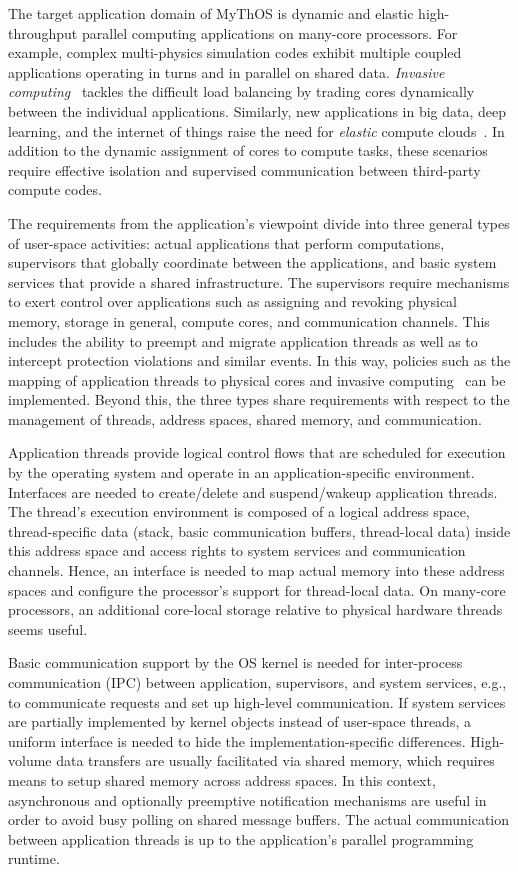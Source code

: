 The target application domain of MyThOS is dynamic and elastic high-throughput parallel 
computing applications on many-core processors. 
%
For example, complex multi-physics simulation codes exhibit multiple coupled applications operating in turns and in parallel on shared data. \emph{Invasive computing}~\cite{InvasiveComputing,octopos} tackles the difficult load balancing by trading cores dynamically between the individual applications.
%
Similarly, new applications in big data, deep learning, and the internet of things raise the need for \emph{elastic} compute clouds~\cite{Rhoden:2011:IPE:2038916.2038941}. In addition to the dynamic assignment of cores to compute tasks, these scenarios require effective isolation and supervised communication between third-party compute codes.

The requirements from the application's viewpoint divide into three general
types of user-space activities: actual applications that perform computations,
supervisors that globally coordinate between the applications, and basic system
services that provide a shared infrastructure.
The supervisors require mechanisms to exert control over applications such as
assigning and revoking physical memory, storage in general, compute cores, and communication channels.
This includes the ability to preempt and migrate application threads as well as 
to intercept protection violations and similar events. In this way, 
policies such as the mapping of application threads to physical cores and invasive computing~\cite{InvasiveComputing} can be implemented.
Beyond this, the three types share requirements with respect to the management
of threads, address spaces, shared memory, and communication.

Application threads provide logical control flows that are scheduled for 
execution by the operating system and operate in an application-specific 
environment.
Interfaces are needed to create/delete and 
suspend/wakeup application threads.
The thread's execution environment is composed of a logical address space, 
thread-specific data (stack, basic communication buffers, thread-local data) 
inside this address space and access rights to system services and 
communication channels.    
Hence, an interface is needed to map actual memory into these address spaces and configure the processor's support for thread-local data.
On many-core processors, an additional core-local storage relative to 
physical hardware threads seems useful.

Basic communication support by the OS kernel is needed for inter-process communication (IPC) between application, supervisors, and system services, e.g., to communicate requests and set up high-level communication.
If system services are partially implemented by kernel objects instead of user-space threads, a uniform interface is needed to hide the implementation-specific differences.  
High-volume data transfers are usually facilitated via shared memory, which requires means to setup shared memory across address spaces.
In this context, asynchronous and optionally preemptive notification mechanisms
are useful in order to avoid busy polling on shared message buffers.
The actual communication between application threads is up to the application's parallel programming runtime. 


